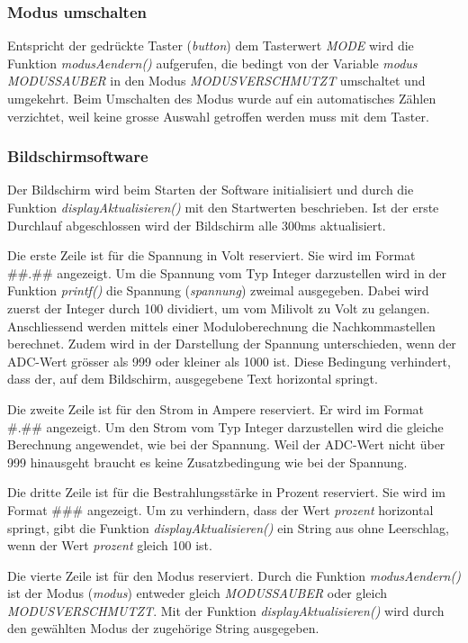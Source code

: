 \subsubsection{Modus umschalten}
Entspricht der gedrückte Taster (\textit{button}) dem Tasterwert \textit{MODE} wird die Funktion \textit{modusAendern()} aufgerufen, die bedingt von der Variable  \textit{modus} \textit{MODUSSAUBER} in den Modus \textit{MODUSVERSCHMUTZT} umschaltet und umgekehrt. Beim Umschalten des Modus wurde auf ein automatisches Zählen verzichtet, weil keine grosse Auswahl getroffen werden muss mit dem Taster.

\subsubsection{Bildschirmsoftware}
Der Bildschirm wird beim Starten der Software initialisiert und durch die Funktion \textit{displayAktualisieren()} mit den Startwerten beschrieben. Ist der erste Durchlauf abgeschlossen wird der Bildschirm alle 300ms aktualisiert.

Die erste Zeile ist für die Spannung in Volt reserviert. Sie wird im Format \#\#.\#\# angezeigt. Um die Spannung vom Typ Integer darzustellen wird in der Funktion \textit{printf()} die Spannung (\textit{spannung}) zweimal ausgegeben. Dabei wird zuerst der Integer durch 100 dividiert, um vom Milivolt zu Volt zu gelangen. Anschliessend werden mittels einer Moduloberechnung die Nachkommastellen berechnet. Zudem wird in der Darstellung der Spannung unterschieden, wenn der ADC-Wert grösser als 999 oder kleiner als 1000 ist. Diese Bedingung verhindert, dass der, auf dem Bildschirm, ausgegebene Text horizontal springt.

Die zweite Zeile ist für den Strom in Ampere reserviert. Er wird im Format \#.\#\# angezeigt. Um den Strom vom Typ Integer darzustellen wird die gleiche Berechnung angewendet, wie bei der Spannung. Weil der ADC-Wert nicht über 999 hinausgeht braucht es keine Zusatzbedingung wie bei der Spannung.

Die dritte Zeile ist für die Bestrahlungsstärke in Prozent reserviert. Sie wird im Format \#\#\# angezeigt. Um zu verhindern, dass der Wert \textit{prozent} horizontal springt, gibt die Funktion \textit{displayAktualisieren()} ein String aus ohne Leerschlag, wenn der Wert \textit{prozent} gleich 100 ist.

Die vierte Zeile ist für den Modus reserviert. Durch die Funktion \textit{modusAendern()} ist der Modus (\textit{modus}) entweder gleich \textit{MODUSSAUBER} oder gleich \textit{MODUSVERSCHMUTZT}. Mit der Funktion \textit{displayAktualisieren()} wird durch den gewählten Modus der zugehörige String ausgegeben.